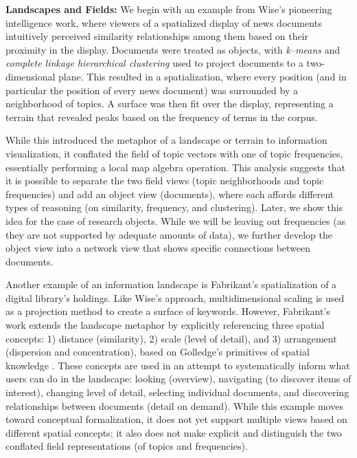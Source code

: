 \documentclass[a4paper,UKenglish]{lipics-v2018}
\begin{document}
\noindent \textbf{Landscapes and Fields:} We begin with an example from Wise's \cite{Wise1999a} pioneering intelligence work, where viewers of a spatialized display of news documents intuitively perceived similarity relationships among them based on their proximity in the display. Documents were treated as objects, with \textit{k--means} and \textit{complete linkage hierarchical clustering} used to project documents to a two-dimensional plane. This resulted in a spatialization, where every position (and in particular the position of every news document) was surrounded by a neighborhood of topics. A surface was then fit over the display, representing a terrain that revealed peaks based on the frequency of terms in the corpus.

While this introduced the metaphor of a landscape or terrain to information visualization, it conflated the field of topic vectors with one of topic frequencies, essentially performing a local map algebra operation. This analysis suggests that it is possible to separate the two field views (topic neighborhoods and topic frequencies) and add an object view (documents), where each affords different types of reasoning (on similarity, frequency, and clustering). Later, we show this idea for the case of research objects. While we will be leaving out frequencies (as they are not supported by adequate amounts of data), we further develop the object view into a network view that shows specific connections between documents.

Another example of an information landscape is Fabrikant's \cite{Fabrikant2000b} spatialization of a digital library's holdings. Like Wise’s approach, multidimensional scaling is used as a projection method to create a surface of keywords. However, Fabrikant's work extends the landscape metaphor by explicitly referencing three spatial concepts: 1) distance (similarity), 2) scale (level of detail), and 3) arrangement (dispersion and concentration), based on Golledge's primitives of spatial knowledge \cite{Golledge1995a}. These concepts are used in an attempt to systematically inform what users can do in the landscape: looking (overview), navigating (to discover items of interest), changing level of detail, selecting individual documents, and discovering relationships between documents (detail on demand). While this example moves toward conceptual formalization, it does not yet support multiple views based on different spatial concepts; it also does not make explicit and distinguish the two conflated field representations (of topics and frequencies). \newline
\end{document}
